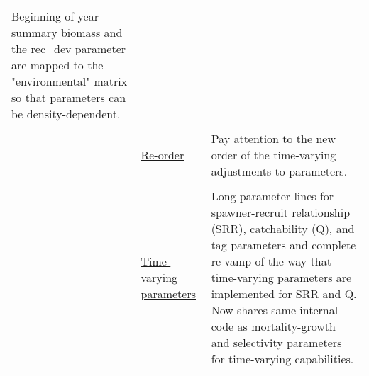 \documentclass[12pt]{article}
\begin{document}
\begin{center}
\begin{longtable}{p{2cm} p{3cm} p{10cm}}
		Beginning of year summary biomass and the rec\_dev parameter are mapped to the    "environmental" matrix so that parameters can be density-dependent.\\
		\\						
		& \hyperlink{tvOrder}{Re-order} & 
		Pay attention to the new order of the time-varying adjustments to parameters. \\
		\\						
		& \hyperlink{time-vary}{Time-varying parameters} & 
		Long parameter lines for spawner-recruit relationship (SRR), catchability (Q), and tag parameters and complete re-vamp of the way that time-varying parameters are implemented for SRR and Q.  Now shares same internal code as mortality-growth and selectivity parameters for time-varying capabilities.\\	
		\hline
	\end{longtable}
\end{center}


%		
%		
%		
		
		
\end{document}
